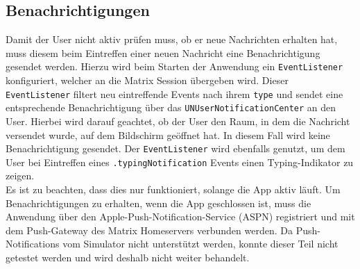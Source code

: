     \subsection{Benachrichtigungen}\label{subsec:benachrichtigungen}
    Damit der User nicht aktiv prüfen muss, ob er neue Nachrichten erhalten hat, muss diesem beim Eintreffen einer neuen Nachricht eine Benachrichtigung gesendet werden.
    Hierzu wird beim Starten der Anwendung ein \texttt{EventListener} konfiguriert, welcher an die Matrix Session übergeben wird.
    Dieser \texttt{EventListener} filtert neu eintreffende Events nach ihrem \texttt{type} und sendet eine entsprechende Benachrichtigung über das \texttt{UNUserNotificationCenter} an den User.
    Hierbei wird darauf geachtet, ob der User den Raum, in dem die Nachricht versendet wurde, auf dem Bildschirm geöffnet hat.
    In diesem Fall wird keine Benachrichtigung gesendet.
    Der \texttt{EventListener} wird ebenfalls genutzt, um dem User bei Eintreffen eines \texttt{.typingNotification} Events einen Typing-Indikator zu zeigen.\\
    Es ist zu beachten, dass dies nur funktioniert, solange die App aktiv läuft.
    Um Benachrichtigungen zu erhalten, wenn die App geschlossen ist, muss die Anwendung über den Apple-Push-Notification-Service (ASPN) registriert und mit dem Push-Gateway des Matrix Homeservers verbunden werden.
    Da Push-Notifications vom Simulator nicht unterstützt werden, konnte dieser Teil nicht getestet werden und wird deshalb nicht weiter behandelt.

    \newpage
